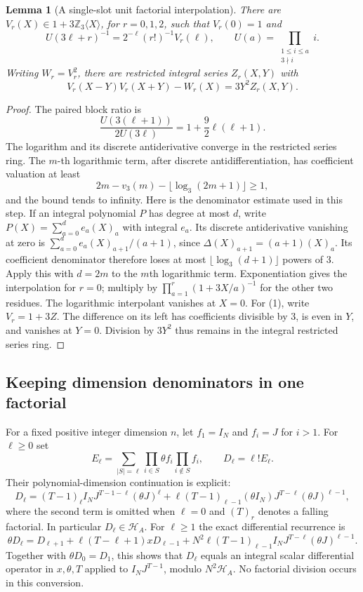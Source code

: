 \documentclass[11pt,a4paper]{article}
\newtheorem{lemma}[theorem]{Lemma}
\theoremstyle{definition}\newtheorem{definition}[theorem]{Definition}
\theoremstyle{remark}\newtheorem{remark}[theorem]{Remark}
\numberwithin{equation}{section}
\begin{document}
\begin{lemma}[A single-slot unit factorial interpolation]
There are $V_r(X)\in1+3\mathbb Z_3\langle X\rangle$, for
$r=0,1,2$, such that $V_r(0)=1$ and
\[
 U(3\ell+r)^{-1}=2^{-\ell}(r!)^{-1}V_r(\ell),\qquad
 U(a)=\prod_{\substack{1\le i\le a\\3\nmid i}}i.
\]
Writing $W_r=V_r^2$, there are restricted integral series $Z_r(X,Y)$
with
\[
 V_r(X-Y)V_r(X+Y)-W_r(X)=3Y^2Z_r(X,Y).
\tag{1}
\]
\end{lemma}
\begin{proof}
The paired block ratio is
\[
 \frac{U(3(\ell+1))}{2U(3\ell)}
       =1+\frac92\ell(\ell+1).
\]
The logarithm and its discrete antiderivative converge in the
restricted series ring.  The $m$-th logarithmic term, after discrete
antidifferentiation, has coefficient valuation at least
\[
 2m-v_3(m)-\lfloor\log_3(2m+1)\rfloor\ge1,
\]
and the bound tends to infinity.  Here is the denominator estimate used
in this step.  If an integral polynomial $P$ has degree at most $d$,
write $P(X)=\sum_{a=0}^d e_a(X)_a$ with integral $e_a$.
Its discrete antiderivative vanishing at zero is
$\sum_{a=0}^d e_a(X)_{a+1}/(a+1)$, since
$\Delta(X)_{a+1}=(a+1)(X)_a$.  Its coefficient denominator therefore
loses at most $\lfloor\log_3(d+1)\rfloor$ powers of $3$.
Apply this with $d=2m$ to the $m$th logarithmic term.
Exponentiation gives the interpolation
for $r=0$; multiply by $\prod_{a=1}^r(1+3X/a)^{-1}$ for the other
two residues.  The logarithmic interpolant vanishes at $X=0$.
For (1), write $V_r=1+3Z$.  The difference on its left has coefficients
divisible by $3$, is even in $Y$, and vanishes at $Y=0$.  Division by
$3Y^2$ thus remains in the integral restricted series ring.
\end{proof}

\subsection{Keeping dimension denominators in one factorial}
For a fixed positive integer dimension $n$, let $f_1=I_N$ and
$f_i=J$ for $i>1$.  For $\ell\ge0$ set
\[
 E_\ell=\sum_{|S|=\ell}\prod_{i\in S}\theta f_i
                              \prod_{i\notin S}f_i,
 \qquad D_\ell=\ell!E_\ell.
\]
Their polynomial-dimension continuation is explicit:
\[
 D_\ell=(T-1)_\ell I_NJ^{T-1-\ell}(\theta J)^\ell
 +\ell(T-1)_{\ell-1}(\theta I_N)J^{T-\ell}
                                  (\theta J)^{\ell-1},
\]
where the second term is omitted when $\ell=0$ and $(T)_r$ denotes
a falling factorial.  In particular $D_\ell\in\mathcal H_A$.
For $\ell\ge1$ the exact differential recurrence is
\[
 \theta D_\ell=D_{\ell+1}
  +\ell(T-\ell+1)xD_{\ell-1}
  +N^2\ell(T-1)_{\ell-1}I_NJ^{T-\ell}(\theta J)^{\ell-1}.
\tag{2}
\]
Together with $\theta D_0=D_1$, this shows that $D_\ell$ equals an integral scalar differential operator
in $x,\theta,T$ applied to $I_NJ^{T-1}$, modulo
$N^2\mathcal H_A$.  No factorial division occurs in this conversion.
\end{document}
